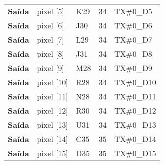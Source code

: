 \begin{longtable}{@{}rllll@{}}
			\multicolumn{1}{r|}{\textbf{Saída}} & pixel {[}5{]}                      & K29                                      & 34                                         & TX\#0\_D5                                       \\
			\multicolumn{1}{r|}{\textbf{Saída}} & pixel {[}6{]}                      & J30                                      & 34                                         & TX\#0\_D6                                       \\
			\multicolumn{1}{r|}{\textbf{Saída}} & pixel {[}7{]}                      & L29                                      & 34                                         & TX\#0\_D7                                       \\
			\multicolumn{1}{r|}{\textbf{Saída}} & pixel {[}8{]}                      & J31                                      & 34                                         & TX\#0\_D8                                       \\
			\multicolumn{1}{r|}{\textbf{Saída}} & pixel {[}9{]}                      & M28                                      & 34                                         & TX\#0\_D9                                       \\
			\multicolumn{1}{r|}{\textbf{Saída}} & pixel {[}10{]}                     & R28                                      & 34                                         & TX\#0\_D10                                      \\
			\multicolumn{1}{r|}{\textbf{Saída}} & pixel {[}11{]}                     & N28                                      & 34                                         & TX\#0\_D11                                      \\
			\multicolumn{1}{r|}{\textbf{Saída}} & pixel {[}12{]}                     & R30                                      & 34                                         & TX\#0\_D12                                      \\
			\multicolumn{1}{r|}{\textbf{Saída}} & pixel {[}13{]}                     & U31                                      & 34                                         & TX\#0\_D13                                      \\
			\multicolumn{1}{r|}{\textbf{Saída}} & pixel {[}14{]}                     & C35                                      & 35                                         & TX\#0\_D14                                      \\
			\multicolumn{1}{r|}{\textbf{Saída}} & pixel {[}15{]}                     & D35                                      & 35                                         & TX\#0\_D15                                      \\

\end{longtable}
